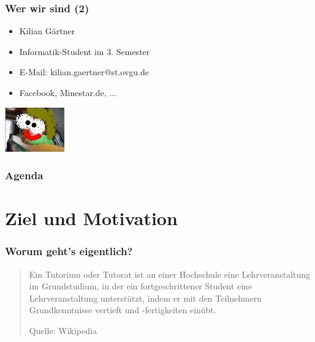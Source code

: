\documentclass[12pt]{beamer}
\begin{document}
\begin{frame}

	\frametitle{Wer wir sind (2)}

	\begin{itemize}
		\item Kilian Gärtner
		\item Informatik-Student im 3. Semester
		\item E-Mail: kilian.gaertner@st.ovgu.de
		\item Facebook, Minestar.de, ...
	\end{itemize}

	\begin{flushright}
		\includegraphics[scale=0.55555]{src/img/wurm}
	\end{flushright}

\end{frame}

\begin{frame}
	\frametitle{Agenda}
	\tableofcontents
\end{frame}


\section{Ziel und Motivation}

\begin{frame}

\frametitle{Worum geht's eigentlich?}

	\begin{quote}
		Ein Tutorium oder Tutorat ist an einer Hochschule eine Lehrveranstaltung
		im Grundstudium, in der ein fortgeschrittener Student eine
		Lehrveranstaltung unterstützt, indem er mit den Teilnehmern
		Grundkenntnisse vertieft und -fertigkeiten einübt.

		\begin{flushright}
			\scriptsize Quelle: Wikipedia
		\end{flushright}

	\end{quote}
	
\end{frame}
\end{document}
